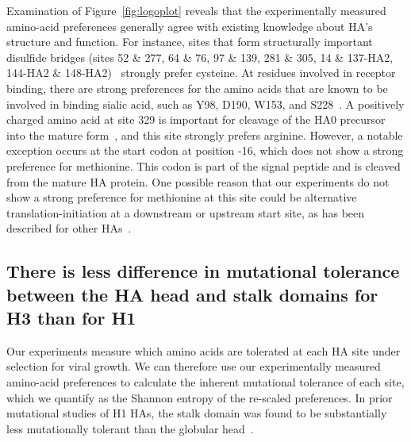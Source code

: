 \documentclass[9pt,twocolumn,twoside]{pnas-new}
\begin{document}
Examination of Figure~\ref{fig:logoplot} reveals that the experimentally measured amino-acid preferences generally agree with existing knowledge about HA's structure and function.
For instance, sites that form structurally important disulfide bridges (sites 52 \& 277, 64 \& 76, 97 \& 139, 281 \& 305, 14 \& 137-HA2, 144-HA2 \& 148-HA2)~\cite{waterfield1981disulphide} strongly prefer cysteine.
At residues involved in receptor binding, there are strong preferences for the amino acids that are known to be involved in binding sialic acid, such as Y98, D190, W153, and S228~\cite{weis1988structure,martin1998studies,nobusawa2000change,yang2015structure}.
A positively charged amino acid at site 329 is important for cleavage of the HA0 precursor into the mature form~\cite{stech2005new}, and this site strongly prefers arginine.
However, a notable exception occurs at the start codon at position -16, which does not show a strong preference for methionine.
This codon is part of the signal peptide and is cleaved from the mature HA protein.
One possible reason that our experiments do not show a strong preference for methionine at this site could be alternative translation-initiation at a downstream or upstream start site, as has been described for other HAs~\cite{girard2011upstream}.

\subsection*{There is less difference in mutational tolerance between the HA head and stalk domains for H3 than for H1}
Our experiments measure which amino acids are tolerated at each HA site under selection for viral growth.
We can therefore use our experimentally measured amino-acid preferences to calculate the inherent mutational tolerance of each site, which we quantify as the Shannon entropy of the re-scaled preferences.
In prior mutational studies of H1 HAs, the stalk domain was found to be substantially less mutationally tolerant than the globular head~\cite{thyagarajan2014inherent,wu2014high,doud2016accurate,heaton2013genome}.
\end{document}
